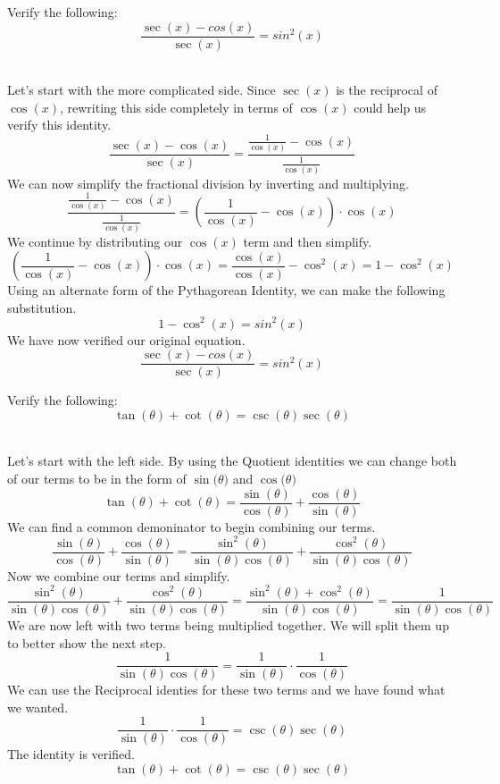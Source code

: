 \documentclass{ximera}
\begin{document}
\begin{example}
Verify the following:\\
\[
\frac{\sec{(x)}-cos{(x)}}{\sec{(x)}}=sin^2{(x)}
\]
\\
\begin{explanation}
Let's start with the more complicated side. Since $\sec{(x)}$ is the reciprocal of $\cos{(x)}$, rewriting this side completely in terms of $\cos{(x)}$ could help us verify this identity.
\[
\frac{\sec{(x)}-\cos{(x)}}{\sec{(x)}} = \frac{\frac{1}{\cos{(x)}}-\cos{(x)}}{\frac{1}{\cos{(x)}}}
\]
We can now simplify the fractional division by inverting and multiplying.
\[
\frac{\frac{1}{\cos{(x)}}-\cos{(x)}}{\frac{1}{\cos{(x)}}} = \left(\frac{1}{\cos{(x)}}-\cos{(x)}\right) \cdot \cos{(x)}
\]
We continue by distributing our $\cos{(x)}$ term and then simplify.
\[
\left(\frac{1}{\cos{(x)}}-\cos{(x)}\right) \cdot \cos{(x)} = \frac{\cos{(x)}}{\cos{(x)}}-\cos^2{(x)} = 1 - \cos^2{(x)}
\]
Using an alternate form of the Pythagorean Identity, we can make the following substitution.
\[
1 - \cos^2{(x)} = sin^2{(x)}
\]
We have now verified our original equation.
\[
\frac{\sec{(x)}-cos{(x)}}{\sec{(x)}}=sin^2{(x)}
\]
\end{explanation}
\end{example}
\begin{example}
Verify the following:\\
\[
\tan{(\theta)}+ \cot{(\theta)}=\csc{(\theta)}\sec{(\theta)}
\]
\\
\begin{explanation}
Let's start with the left side. By using the Quotient identities we can change both of our terms to be in the form of $\sin{(\theta})$ and  $\cos{(\theta})$ 
\[
\tan{(\theta)}+ \cot{(\theta)}=\frac{\sin{(\theta)}}{\cos{(\theta)}} + \frac{\cos{(\theta)}}{\sin{(\theta)}}
\]
We can find a common demoninator to begin combining our terms.
\[
\frac{\sin{(\theta)}}{\cos{(\theta)}} + \frac{\cos{(\theta)}}{\sin{(\theta)}} = \frac{\sin^2{(\theta)}}{\sin{(\theta)}\cos{(\theta)}} + \frac{\cos^2{(\theta)}}{\sin{(\theta)}\cos{(\theta)}}
\]
Now we combine our terms and simplify.
\[
 \frac{\sin^2{(\theta)}}{\sin{(\theta)}\cos{(\theta)}} + \frac{\cos^2{(\theta)}}{\sin{(\theta)}\cos{(\theta)}} = \frac{\sin^2{(\theta)} + \cos^2{(\theta)}}{\sin{(\theta)}\cos{(\theta)}} = \frac{1}{\sin{(\theta)}\cos{(\theta)}}
\]
We are now left with two terms being multiplied together. We will split them up to better show the next step.
\[
\frac{1}{\sin{(\theta)}\cos{(\theta)}} = \frac{1}{\sin{(\theta)}} \cdot \frac{1}{\cos{(\theta)}}
\]
We can use the Reciprocal identies for these two terms and we have found what we wanted.
\[
\frac{1}{\sin{(\theta)}} \cdot \frac{1}{\cos{(\theta)}} = \csc{(\theta)}\sec{(\theta)}
\]
The identity is verified.
\[
\tan{(\theta)}+ \cot{(\theta)}=\csc{(\theta)}\sec{(\theta)}
\]
\end{explanation}
\end{example}
\end{document}

